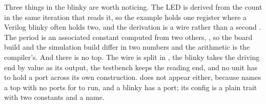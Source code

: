 Three things in the blinky are worth noticing. The LED is derived from
the count in the same iteration that reads it, so the example holds one
register where a Verilog blinky often holds two, and the derivation is a
wire rather than a second . The period is an associated
constant computed from two others, , so the
board build and the simulation build differ in two numbers and the
arithmetic is the compiler's. And there is no top. The wire is split in
, the blinky takes the driving end by value as its output,
the testbench keeps the reading end, and no unit has to hold a port
across its own construction.  does not appear either,
because  names a top with no ports for  to
run, and a blinky has a port; its config is a plain trait with two
constants and a name.
